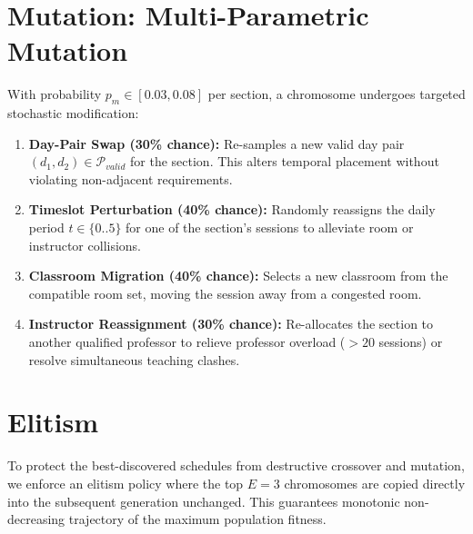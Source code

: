 \section{Mutation: Multi-Parametric Mutation}
With probability $p_m \in [0.03, 0.08]$ per section, a chromosome undergoes targeted stochastic modification:
\begin{enumerate}[leftmargin=1.5em]
  \item \textbf{Day-Pair Swap (30\% chance):} Re-samples a new valid day pair $(d_1, d_2) \in \mathcal{P}_{valid}$ for the section. This alters temporal placement without violating non-adjacent requirements.
  \item \textbf{Timeslot Perturbation (40\% chance):} Randomly reassigns the daily period $t \in \{0..5\}$ for one of the section's sessions to alleviate room or instructor collisions.
  \item \textbf{Classroom Migration (40\% chance):} Selects a new classroom from the compatible room set, moving the session away from a congested room.
  \item \textbf{Instructor Reassignment (30\% chance):} Re-allocates the section to another qualified professor to relieve professor overload ($>20$ sessions) or resolve simultaneous teaching clashes.
\end{enumerate}

\section{Elitism}
To protect the best-discovered schedules from destructive crossover and mutation, we enforce an elitism policy where the top $E = 3$ chromosomes are copied directly into the subsequent generation unchanged. This guarantees monotonic non-decreasing trajectory of the maximum population fitness.

